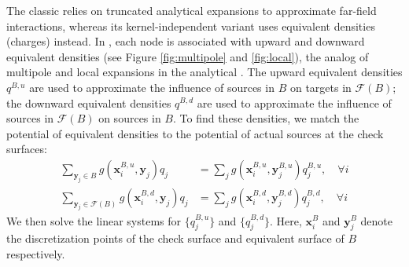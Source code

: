 The classic \fmm \cite{greengard1987fast, cheng1999fast} relies on truncated analytical expansions to approximate far-field interactions, whereas its kernel-independent variant \cite{ying2004kernel} uses equivalent densities (charges) instead.
In \kifmm, each node is associated with upward and downward equivalent densities (see Figure \ref{fig:multipole} and \ref{fig:local}), the analog of multipole and local expansions in the analytical \fmm.
The upward equivalent densities $q^{B,u}$ are used to approximate the influence of sources in $B$ on targets in $\mathcal{F}(B)$;
the downward equivalent densities $q^{B,d}$ are used to approximate the influence of sources in $\mathcal{F}(B)$ on sources in $B$.
To find these densities, we match the potential of equivalent densities to the potential of actual sources at the check surfaces:
%
\begin{align}\label{eq:multipole_local}
    \sum_{\mathbf{y}_{j} \in B} g\left(\mathbf{x}_{i}^{B,u}, \mathbf{y}_{j}\right) q_{j} &= \sum_{j} g\left(\mathbf{x}_{i}^{B,u}, \mathbf{y}^{B,u}_{j}\right) q^{B,u}_{j}, \quad \forall i  \nonumber \\
    \sum_{\mathbf{y}_{j} \in \mathcal{F}(B)} g\left(\mathbf{x}_{i}^{B,d}, \mathbf{y}_{j}\right) q_{j} &= \sum_{j} g\left(\mathbf{x}_{i}^{B,d}, \mathbf{y}^{B,d}_{j}\right) q^{B,d}_{j}, \quad \forall i
\end{align}
%
We then solve the linear systems for $\{q^{B,u}_{j}\}$ and $\{q^{B,d}_{j}\}$.
Here, $\mathbf{x}_{i}^{B}$ and $\mathbf{y}_{j}^{B}$ denote the discretization points of the check surface and equivalent surface of $B$ respectively.

